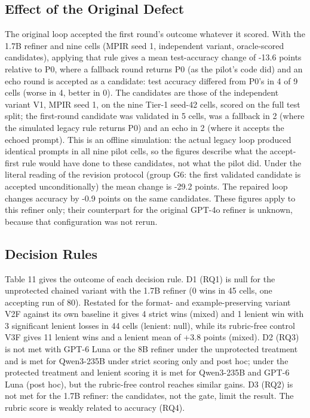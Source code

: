 \documentclass{ieeeaccess}
\begin{document}
\subsection{Effect of the Original Defect}

The original loop accepted the first round's outcome whatever it scored. With the 1.7B refiner and nine cells (MPIR seed 1, independent variant, oracle-scored candidates), applying that rule gives a mean test-accuracy change of -13.6 points relative to P0, where a fallback round returns P0 (as the pilot's code did) and an echo round is accepted as a candidate: test accuracy differed from P0's in 4 of 9 cells (worse in 4, better in 0). The candidates are those of the independent variant V1, MPIR seed 1, on the nine Tier-1 seed-42 cells, scored on the full test split; the first-round candidate was validated in 5 cells, was a fallback in 2 (where the simulated legacy rule returns P0) and an echo in 2 (where it accepts the echoed prompt). This is an offline simulation: the actual legacy loop produced identical prompts in all nine pilot cells, so the figures describe what the accept-first rule would have done to these candidates, not what the pilot did. Under the literal reading of the revision protocol (group G6: the first validated candidate is accepted unconditionally) the mean change is -29.2 points. The repaired loop changes accuracy by -0.9 points on the same candidates. These figures apply to this refiner only; their counterpart for the original GPT-4o refiner is unknown, because that configuration was not rerun.

\subsection{Decision Rules}

Table 11 gives the outcome of each decision rule. D1 (RQ1) is null for the unprotected chained variant with the 1.7B refiner (0 wins in 45 cells, one accepting run of 80). Restated for the format- and example-preserving variant V2F against its own baseline it gives 4 strict wins (mixed) and 1 lenient win with 3 significant lenient losses in 44 cells (lenient: null), while its rubric-free control V3F gives 11 lenient wins and a lenient mean of +3.8 points (mixed). D2 (RQ3) is not met with GPT-6 Luna or the 8B refiner under the unprotected treatment and is met for Qwen3-235B under strict scoring only and post hoc; under the protected treatment and lenient scoring it is met for Qwen3-235B and GPT-6 Luna (post hoc), but the rubric-free control reaches similar gains. D3 (RQ2) is not met for the 1.7B refiner: the candidates, not the gate, limit the result. The rubric score is weakly related to accuracy (RQ4).
\end{document}
